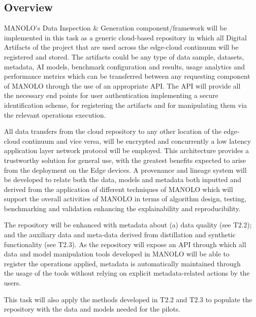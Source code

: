 

\subsection{Overview}

MANOLO's Data Inspection \& Generation component/framework will be
implemented in this task as a generic cloud-based repository in which
all Digital Artifacts of the project that are used across the
edge-cloud continuum will be registered and stored. The artifacts
could be any type of data sample, datasets, metadata, AI models,
benchmark configuration and results, usage analytics and performance
metrics which can be transferred between any requesting component of
MANOLO through the use of an appropriate API. The API will provide all
the necessary end points for user authentication implementing a secure
identification scheme, for registering the artifacts and for
manipulating them via the relevant operations execution.

All data
transfers from the cloud repository to any other location of the
edge-cloud continuum and vice versa, will be encrypted and
concurrently a low latency application layer network protocol will be
employed. This architecture provides a trustworthy solution for
general use, with the greatest benefits expected to arise from the
deployment on the Edge devices. A provenance and lineage system will
be developed to relate both the data, models and metadata both
inputted and derived from the application of different techniques of
MANOLO which will support the overall activities of MANOLO in terms of
algorithm design, testing, benchmarking and validation enhancing the
explainability and reproducibility.

The repository will be enhanced
with metadata about (a) data quality (see T2.2); and the auxiliary
data and meta-data derived from distillation and synthetic
functionality (see T2.3). As the repository will expose an API through
which all data and model manipulation tools developed in MANOLO will
be able to register the operations applied, metadata is automatically
maintained through the usage of the tools without relying on explicit
metadata-related actions by the users.

This task will also apply the
methods developed in T2.2 and T2.3 to populate the repository with the
data and models needed for the pilots.



